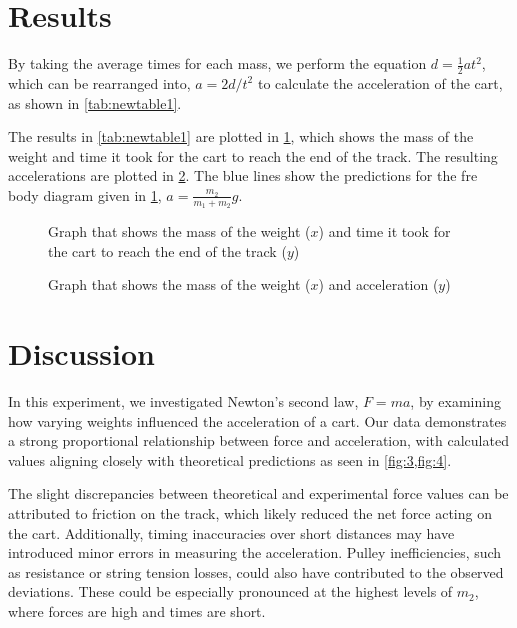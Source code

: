﻿\documentclass[reprint,amsmath,amssymb,aps,twoside]{revtex4-2}
\begin{document}
\section{Results}
By taking the average times for each mass, we perform the equation $d = \frac{1}{2} a t^2$, which can be rearranged into, $a=2d/t^2$ to calculate the acceleration of the cart, as shown in \cref{tab:newtable1}. 


The results in \cref{tab:newtable1} are plotted in \cref{fig:3}, which shows the mass of the weight and time it took for the cart to reach the end of the track. The resulting accelerations are plotted in \cref{fig:4}. The blue lines show the predictions for the fre body diagram given in \cref{fig:3}, $a=\frac{m_2}{m_1+m_2} g$. 
\begin{figure}
\begin{center}

\end{center}
\caption{Graph that shows the mass of the weight ($x$) and time it took for the cart to reach the end of the track ($y$)}
\label{fig:3}
\end{figure}

\begin{figure}
\begin{center}

\end{center}
\caption{Graph that shows the mass of the weight ($x$) and acceleration ($y$)}
\label{fig:4}
\end{figure}







\section{Discussion}
In this experiment, we investigated Newton’s second law, $F=ma$, by examining how varying weights influenced the acceleration of a cart. Our data demonstrates a strong proportional relationship between force and acceleration, with calculated values aligning closely with theoretical predictions as seen in \cref{fig:3,fig:4}.

The slight discrepancies between theoretical and experimental force values can be attributed to friction on the track, which likely reduced the net force acting on the cart. Additionally, timing inaccuracies over short distances may have introduced minor errors in measuring the acceleration. Pulley inefficiencies, such as resistance or string tension losses, could also have contributed to the observed deviations. These could be especially pronounced at the highest levels of $m_2$, where forces are high and times are short. 
\end{document}
